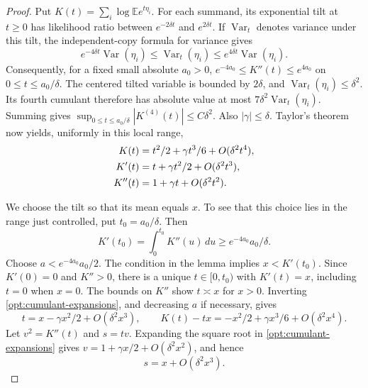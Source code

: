 \documentclass[11pt,a4paper]{article}
\theoremstyle{remark}
\newcommand{\E}{\mathbb E}
\newcommand{\Var}{\operatorname{Var}}
\begin{document}
\begin{proof}
Put \(K(t)=\sum_i\log\E e^{t\eta_i}\). For each summand, its
exponential tilt at \(t\ge0\) has likelihood ratio between
\(e^{-2\delta t}\) and \(e^{2\delta t}\). If \(\Var_t\) denotes variance
under this tilt, the independent-copy formula for variance gives
\[
 e^{-4\delta t}\Var(\eta_i)
 \le\Var_t(\eta_i)\le e^{4\delta t}\Var(\eta_i).
\]
Consequently, for a fixed small absolute \(a_0>0\),
\(e^{-4a_0}\le K''(t)\le e^{4a_0}\) on
\(0\le t\le a_0/\delta\). The centered tilted variable is bounded by
\(2\delta\), and \(\Var_t(\eta_i)\le\delta^2\). Its fourth cumulant
therefore has absolute value at most
\(7\delta^2\Var_t(\eta_i)\). Summing gives
\(\sup_{0\le t\le a_0/\delta}|K^{(4)}(t)|\le C\delta^2\).
Also \(|\gamma|\le\delta\). Taylor's theorem now yields, uniformly in
this local range,
\begin{align}
 K(t)&=t^2/2+\gamma t^3/6+O(\delta^2t^4),\notag\\
 K'(t)&=t+\gamma t^2/2+O(\delta^2t^3),\notag\\
 K''(t)&=1+\gamma t+O(\delta^2t^2).
 \label{opt:cumulant-expansions}
\end{align}

We choose the tilt so that its mean equals \(x\). To see that this
choice lies in the range just controlled, put \(t_0=a_0/\delta\).
Then
\[
 K'(t_0)=\int_0^{t_0}K''(u)\,du
 \ge e^{-4a_0}a_0/\delta.
\]
Choose \(a<e^{-4a_0}a_0/2\). The condition in the lemma implies
\(x<K'(t_0)\). Since \(K'(0)=0\) and \(K''>0\), there is a unique
\(t\in[0,t_0)\) with \(K'(t)=x\), including \(t=0\) when \(x=0\).
The bounds on \(K''\) show \(t\asymp x\) for \(x>0\).
Inverting \eqref{opt:cumulant-expansions}, and decreasing \(a\) if
necessary, gives
\begin{equation}
 t=x-\gamma x^2/2+O(\delta^2x^3),\qquad
 K(t)-tx=-x^2/2+\gamma x^3/6+O(\delta^2x^4).
 \label{opt:tilt-root}
\end{equation}
Let \(v^2=K''(t)\) and \(s=tv\). Expanding the square root in
\eqref{opt:cumulant-expansions} gives
\(v=1+\gamma x/2+O(\delta^2x^2)\), and hence
\begin{equation}
 s=x+O(\delta^2x^3).
 \label{opt:tilted-scale}
\end{equation}


\end{proof}
\end{document}
